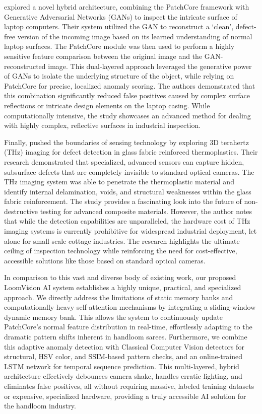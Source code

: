 \documentclass{ieeeaccess}
\begin{document}
\cite{b24} explored a novel hybrid architecture, combining the PatchCore framework with Generative Adversarial Networks (GANs) to inspect the intricate surface of laptop computers. Their system utilized the GAN to reconstruct a `clean', defect-free version of the incoming image based on its learned understanding of normal laptop surfaces. The PatchCore module was then used to perform a highly sensitive feature comparison between the original image and the GAN-reconstructed image. This dual-layered approach leveraged the generative power of GANs to isolate the underlying structure of the object, while relying on PatchCore for precise, localized anomaly scoring. The authors demonstrated that this combination significantly reduced false positives caused by complex surface reflections or intricate design elements on the laptop casing. While computationally intensive, the study showcases an advanced method for dealing with highly complex, reflective surfaces in industrial inspection.

Finally, \cite{b25} pushed the boundaries of sensing technology by exploring 3D terahertz (THz) imaging for defect detection in glass fabric reinforced thermoplastics. Their research demonstrated that specialized, advanced sensors can capture hidden, subsurface defects that are completely invisible to standard optical cameras. The THz imaging system was able to penetrate the thermoplastic material and identify internal delamination, voids, and structural weaknesses within the glass fabric reinforcement. The study provides a fascinating look into the future of non-destructive testing for advanced composite materials. However, the author notes that while the detection capabilities are unparalleled, the hardware cost of THz imaging systems is currently prohibitive for widespread industrial deployment, let alone for small-scale cottage industries. The research highlights the ultimate ceiling of inspection technology while reinforcing the need for cost-effective, accessible solutions like those based on standard optical cameras.

In comparison to this vast and diverse body of existing work, our proposed LoomVision AI system establishes a highly unique, practical, and specialized approach. We directly address the limitations of static memory banks and computationally heavy self-attention mechanisms by integrating a sliding-window dynamic memory bank. This allows the system to continuously update PatchCore's normal feature distribution in real-time, effortlessly adapting to the dramatic pattern shifts inherent in handloom sarees. Furthermore, we combine this adaptive anomaly detection with Classical Computer Vision detectors for structural, HSV color, and SSIM-based pattern checks, and an online-trained LSTM network for temporal sequence prediction. This multi-layered, hybrid architecture effectively debounces camera shake, handles erratic lighting, and eliminates false positives, all without requiring massive, labeled training datasets or expensive, specialized hardware, providing a truly accessible AI solution for the handloom industry.
\end{document}
